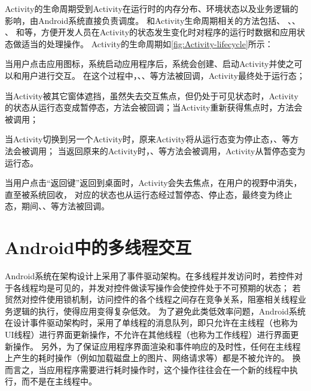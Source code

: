 Activity的生命周期受到Activity在运行时的内存分布、环境状态以及业务逻辑的影响，由Android系统直接负责调度。
和{Activity}生命周期相关的方法包括、 、、 、 和等，方便开发人员在Activity的状态发生变化时对程序的运行时数据和应用状态做适当的处理操作。
{Activity}的生命周期如\autoref{fig:Activity-lifecycle}所示：



当用户点击应用图标，系统启动应用程序后，系统会创建、启动Activity并使之可以和用户进行交互。
在这个过程中，、、等方法被回调，Activity最终处于运行态；


当Activity被其它窗体遮挡，虽然失去交互焦点，但仍处于可见状态时，Activity的状态从运行态变成暂停态，方法会被回调；当Activity重新获得焦点时，方法会被调用；

当Activity切换到另一个Activity时，原来Activity将从运行态变为停止态，、等方法会被调用；
当返回原来的Activity时，、等方法会被调用，Activity从暂停态变为运行态。

当用户点击“返回键”返回到桌面时，Activity会失去焦点，在用户的视野中消失，直至被系统回收，
对应的状态也从运行态经过暂停态、停止态，最终变为终止态，期间、、等方法被回调。



\section{Android中的多线程交互}
Android系统在架构设计上采用了事件驱动架构。在多线程并发访问时，若控件对于各线程均是可见的，并发对控件做读写操作会使控件处于不可预期的状态；
若贸然对控件使用锁机制，访问控件的各个线程之间存在竞争关系，阻塞相关线程业务逻辑的执行，使得应用变得复杂低效。
为了避免此类低效率问题，Android系统在设计事件驱动架构时，采用了单线程的消息队列，即只允许在主线程（也称为UI线程）进行界面更新操作，不允许在其他线程（也称为工作线程）进行界面更新操作。
另外，为了保证应用程序界面渲染和事件响应的及时性，任何在主线程上产生的耗时操作（例如加载磁盘上的图片、网络请求等）都是不被允许的。
换而言之，当应用程序需要进行耗时操作时，这个操作往往会在一个新的线程中执行，而不是在主线程中。


